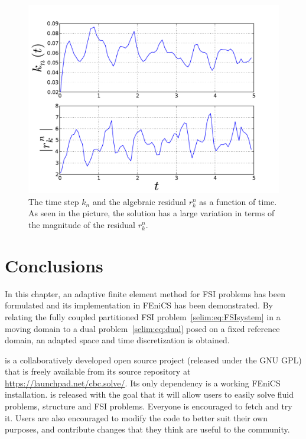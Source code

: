 \begin{figure}
  \centering
  \includegraphics[width=\largefig]{chapters/selim/pdf/plot.pdf}
  \caption{The time step $k_n$ and the algebraic residual $r_k^n$ as
    a function of time. As seen in the picture, the solution has a large
    variation in terms of the magnitude of the residual $r_k^n$.}
  \label{selim:fig:cavity_timestep}
\end{figure}

\section{Conclusions}

In this chapter, an adaptive finite element method for FSI
problems has been formulated and its implementation in FEniCS has
been demonstrated. By relating the fully coupled partitioned FSI
problem~\eqref{selim:eq:FSIsystem} in a moving domain to a dual
problem~\eqref{selim:eq:dual} posed on a fixed reference domain, an
adapted space and time discretization is obtained.

 is a collaboratively developed open source project
(released under the GNU GPL) that is freely available from its source
repository at \url{https://launchpad.net/cbc.solve/}. Its only dependency
is a working FEniCS installation.  is released with the
goal that it will allow users to easily solve fluid problems, structure
and FSI problems. Everyone is encouraged to fetch and try it.  Users are
also encouraged to modify the code to better suit their own purposes,
and contribute changes that they think are useful to the community.


